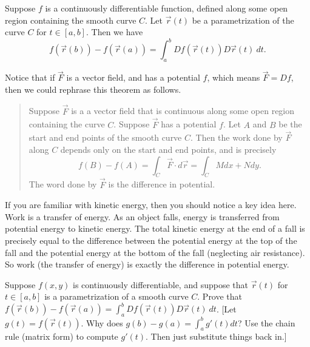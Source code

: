 \begin{theorem}
%
 Suppose $f$ is a continuously differentiable function, defined along some open region containing the smooth curve $C$. Let $\vec r(t)$ be a parametrization of the curve $C$ for $t\in[a,b]$. Then we have
$$f(\vec r(b))-f(\vec r(a))=\int_a^b Df(\vec r(t))D\vec r(t)\ dt.$$
\end{theorem}
Notice that if $\vec F$ is a vector field, and has a potential $f$, which means $\vec F = Df$, then we could rephrase this theorem as follows. 
\begin{quote}
 Suppose $\vec F$ is a a vector field that is continuous along some open region containing the curve $C$. Suppose $\vec F$ has a potential $f$. Let $A$ and $B$ be the start and end points of the smooth curve $C$.  Then the work done by $\vec F$ along $C$ depends only on the start and end points, and is precisely
$$f(B)-f(A)=\int_C \vec F\cdot d\vec r = \int_C Mdx+Ndy.$$
 The word done by $\vec F$ is the difference in potential.
\end{quote}
If you are familiar with kinetic energy, then you should notice a key idea here.  Work is a transfer of energy. As an object falls, energy is transferred from potential energy to kinetic energy.  The total kinetic energy at the end of a fall is precisely equal to the difference between the potential energy at the top of the fall and the potential energy at the bottom of the fall (neglecting air resistance). So work (the transfer of energy) is exactly the difference in potential energy.  

\begin{problem}
 Suppose $f(x,y)$ is continuously differentiable, and suppose that $\vec r(t)$ for $t\in[a,b]$ is a parametrization of a smooth curve $C$. Prove that $f(\vec r(b))-f(\vec r(a)) = \int_a^b Df(\vec r(t))D\vec r(t)\ dt$. [Let $g(t) = f(\vec r(t))$. Why does $g(b)-g(a) = \int_a^b g'(t)dt$? Use the chain rule (matrix form) to compute $g'(t)$. Then just substitute things back in.]  
\end{problem}

